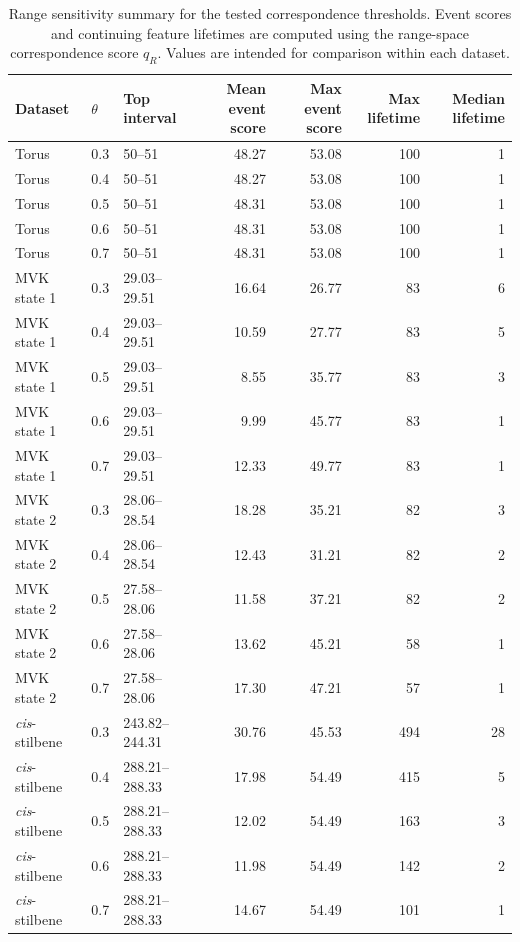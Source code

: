\documentclass[review]{vgtc}
\begin{document}
\begin{table}[t]
\centering
\caption{
Range sensitivity summary for the tested correspondence thresholds. Event scores and continuing feature lifetimes are computed using the range-space correspondence score $q_R$. Values are intended for comparison within each dataset.
}
\label{tab:range-sensitivity-summary}
\begin{tabular}{lllrrrr}
    \toprule
    Dataset & $\theta$ & Top interval & Mean event score & Max event score & Max lifetime & Median lifetime \\
    \midrule
    Torus & 0.3 & 50--51 & 48.27 & 53.08 & 100 & 1 \\
    Torus & 0.4 & 50--51 & 48.27 & 53.08 & 100 & 1 \\
    Torus & 0.5 & 50--51 & 48.31 & 53.08 & 100 & 1 \\
    Torus & 0.6 & 50--51 & 48.31 & 53.08 & 100 & 1 \\
    Torus & 0.7 & 50--51 & 48.31 & 53.08 & 100 & 1 \\
    \midrule
    MVK state 1 & 0.3 & 29.03--29.51 & 16.64 & 26.77 & 83 & 6 \\
    MVK state 1 & 0.4 & 29.03--29.51 & 10.59 & 27.77 & 83 & 5 \\
    MVK state 1 & 0.5 & 29.03--29.51 & 8.55 & 35.77 & 83 & 3 \\
    MVK state 1 & 0.6 & 29.03--29.51 & 9.99 & 45.77 & 83 & 1 \\
    MVK state 1 & 0.7 & 29.03--29.51 & 12.33 & 49.77 & 83 & 1 \\
    \midrule
    MVK state 2 & 0.3 & 28.06--28.54 & 18.28 & 35.21 & 82 & 3 \\
    MVK state 2 & 0.4 & 28.06--28.54 & 12.43 & 31.21 & 82 & 2 \\
    MVK state 2 & 0.5 & 27.58--28.06 & 11.58 & 37.21 & 82 & 2 \\
    MVK state 2 & 0.6 & 27.58--28.06 & 13.62 & 45.21 & 58 & 1 \\
    MVK state 2 & 0.7 & 27.58--28.06 & 17.30 & 47.21 & 57 & 1 \\
    \midrule
    \textit{cis}-stilbene & 0.3 & 243.82--244.31 & 30.76 & 45.53 & 494 & 28 \\
    \textit{cis}-stilbene & 0.4 & 288.21--288.33 & 17.98 & 54.49 & 415 & 5 \\
    \textit{cis}-stilbene & 0.5 & 288.21--288.33 & 12.02 & 54.49 & 163 & 3 \\
    \textit{cis}-stilbene & 0.6 & 288.21--288.33 & 11.98 & 54.49 & 142 & 2 \\
    \textit{cis}-stilbene & 0.7 & 288.21--288.33 & 14.67 & 54.49 & 101 & 1 \\
    \bottomrule
    \end{tabular}
\end{table}
\end{document}
